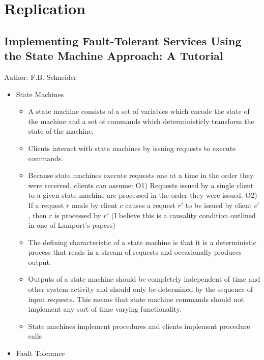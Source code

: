 \documentclass[a4paper]{article}
\begin{document}
\section{Replication}

\subsection{Implementing Fault-Tolerant Services Using the State Machine Approach: A Tutorial}

Author: F.B. Schneider

\begin{itemize}
\item State Machines
\begin{itemize}
\item A state machine consists of a set of variables which encode the state of the machine and a set of commands which deterministicly transform the state of the machine.

\item Clients interact with state machines by issuing requests to execute commands.

\item Because state machines execute requests one at a time in the order they were received, clients can assume: O1) Requests issued by a single client to a given state machine are processed in the order they were issued. O2) If a request $r$ made by client $c$ causes a request $r'$ to be issued by client $c'$, then $r$ is processed by $r'$ (I believe this is a causality condition outlined in one of Lamport's papers)

\item The defining characteristic of a state machine is that it is a deterministic process that reads in a stream of requests and occasionally produces output.

\item Outputs of a state machine should be completely independent of time and other system activity and should only be determined by the sequence of input requests. This means that state machine commands should not implement any sort of time varying functionality.

\item State machines implement procedures and clients implement procedure calls
\end{itemize}

\item Fault Tolerance
\begin{itemize}


\end{itemize}
\end{itemize}
\end{document}
